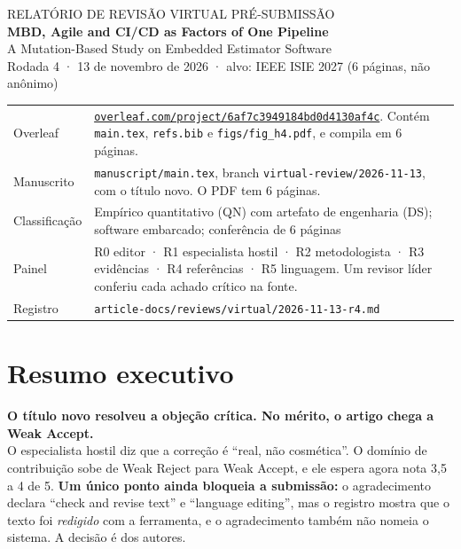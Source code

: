 \documentclass[10pt,a4paper]{article}
\begin{document}
\begin{tcolorbox}[colback=accent,colframe=accent,arc=0pt,left=12pt,right=12pt,top=10pt,bottom=10pt]
\color{white}
{\small RELATÓRIO DE REVISÃO VIRTUAL PRÉ-SUBMISSÃO}\\[3pt]
{\Large\bfseries MBD, Agile and CI/CD as Factors of One Pipeline}\\[2pt]
{\normalsize A Mutation-Based Study on Embedded Estimator Software}\\[6pt]
{\small Rodada 4 · 13 de novembro de 2026 · alvo: IEEE ISIE 2027 (6 páginas, não anônimo)}
\end{tcolorbox}

\vspace{4pt}
\begin{tabularx}{\linewidth}{@{}>{\color{muted}\small}l>{\small}X@{}}
Overleaf & \href{https://www.overleaf.com/project/6af7c3949184bd0d4130af4c}{\color{accent}\texttt{overleaf.com/project/6af7c3949184bd0d4130af4c}}. Contém \texttt{main.tex}, \texttt{refs.bib} e \texttt{figs/fig\_h4.pdf}, e compila em 6 páginas.\\
Manuscrito & \texttt{manuscript/main.tex}, branch \texttt{virtual-review/2026-11-13}, com o título novo. O PDF tem 6 páginas.\\
Classificação & Empírico quantitativo (QN) com artefato de engenharia (DS); software embarcado; conferência de 6 páginas\\
Painel & R0 editor · R1 especialista hostil · R2 metodologista · R3 evidências · R4 referências · R5 linguagem. Um revisor líder conferiu cada achado crítico na fonte.\\
Registro & \texttt{article-docs/reviews/virtual/2026-11-13-r4.md}\\
\end{tabularx}

\section{Resumo executivo}

\begin{tcolorbox}[colback=WA,colframe=WA!50!black,boxrule=0.6pt,arc=2pt,left=10pt,right=10pt]
\textbf{O título novo resolveu a objeção crítica. No mérito, o artigo chega a Weak Accept.}\\[2pt]
O especialista hostil diz que a correção é ``real, não cosmética''. O domínio de contribuição sobe de Weak Reject para Weak Accept, e ele espera agora nota 3,5 a 4 de 5. \textbf{Um único ponto ainda bloqueia a submissão:} o agradecimento declara ``check and revise text'' e ``language editing'', mas o registro mostra que o texto foi \emph{redigido} com a ferramenta, e o agradecimento também não nomeia o sistema. A decisão é dos autores.
\end{tcolorbox}
\end{document}
